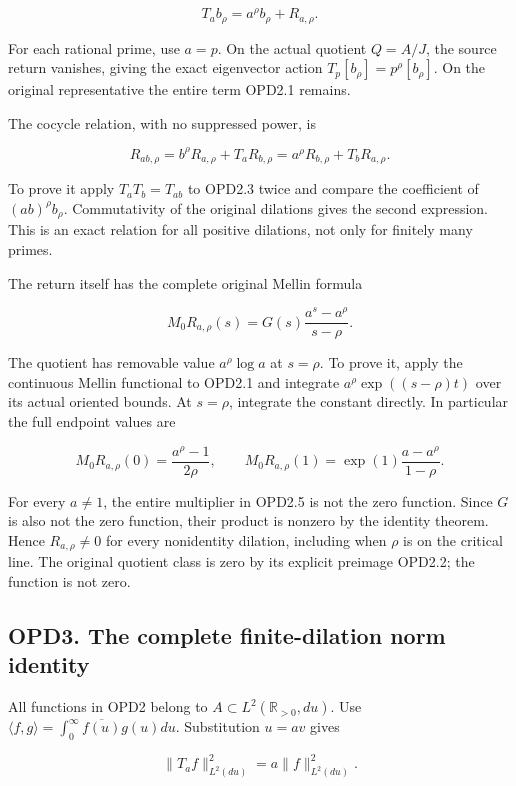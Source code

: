 \[
\boxed{T_ab_\rho=a^\rho b_\rho+R_{a,\rho}.}
\tag{OPD2.3}
\]

For each rational prime, use \(a=p\). On the actual quotient \(Q=A/J\),
the source return vanishes, giving the exact eigenvector action
\(T_p[b_\rho]=p^\rho[b_\rho]\). On the original representative the
entire term OPD2.1 remains.

The cocycle relation, with no suppressed power, is

\[
R_{ab,\rho}=b^\rho R_{a,\rho}+T_aR_{b,\rho}
=a^\rho R_{b,\rho}+T_bR_{a,\rho}.
\tag{OPD2.4}
\]

To prove it apply \(T_aT_b=T_{ab}\) to OPD2.3 twice and compare the
coefficient of \((ab)^\rho b_\rho\). Commutativity of the original
dilations gives the second expression. This is an exact relation for all
positive dilations, not only for finitely many primes.

The return itself has the complete original Mellin formula

\[
M_0R_{a,\rho}(s)=G(s)\frac{a^s-a^\rho}{s-\rho}.
\tag{OPD2.5}
\]

The quotient has removable value \(a^\rho\log a\) at \(s=\rho\). To
prove it, apply the continuous Mellin functional to OPD2.1 and integrate
\(a^\rho\exp((s-\rho)t)\) over its actual oriented bounds. At
\(s=\rho\), integrate the constant directly. In particular the full
endpoint values are

\[
M_0R_{a,\rho}(0)=\frac{a^\rho-1}{2\rho},\qquad
M_0R_{a,\rho}(1)=\exp(1)\frac{a-a^\rho}{1-\rho}.
\tag{OPD2.6}
\]

For every \(a\ne1\), the entire multiplier in OPD2.5 is not the zero
function. Since \(G\) is also not the zero function, their product is
nonzero by the identity theorem. Hence \(R_{a,\rho}\ne0\) for every
nonidentity dilation, including when \(\rho\) is on the critical line.
The original quotient class is zero by its explicit preimage OPD2.2; the
function is not zero.

\subsection{OPD3. The complete finite-dilation norm
identity}\label{opd3.-the-complete-finite-dilation-norm-identity}

All functions in OPD2 belong to \(A\subset L^2(\mathbb R_{>0},du)\). Use
\(\langle f,g\rangle=\int_0^\infty\overline{f(u)}g(u)du\). Substitution
\(u=av\) gives

\[
\|T_af\|_{L^2(du)}^2=a\|f\|_{L^2(du)}^2.
\tag{OPD3.1}
\]


